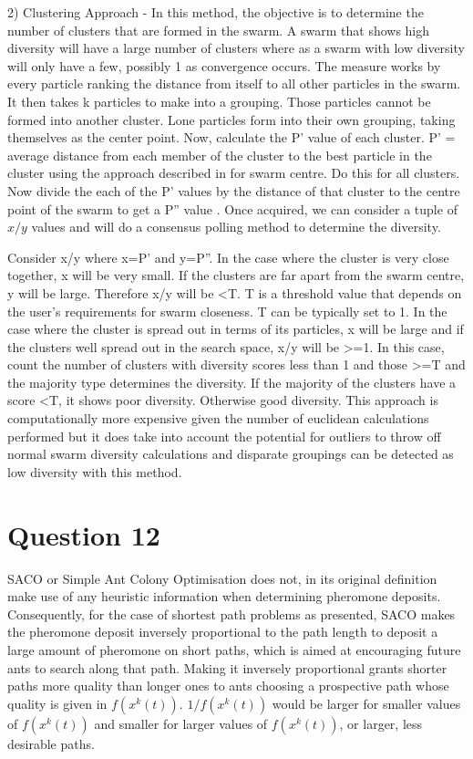 \documentclass[12pt]{article}
\begin{document}
	2) Clustering Approach - In this method, the objective is to determine the number of clusters that are formed in the swarm. A swarm that shows high diversity will have a large number of clusters where as a swarm with low diversity will only have a few, possibly 1 as convergence occurs. The measure works by every particle ranking the distance from itself to all other particles in the swarm. It then takes k particles to make into a grouping. Those particles cannot be formed into another cluster. Lone particles form into their own grouping, taking themselves as the center point.
	Now, calculate the P' value of each cluster. P' = average distance from each member of the cluster to the best particle in the cluster using the approach described in \cite{4630938} for swarm centre. Do this for all clusters. Now divide the each of the P' values by the distance of that cluster to the centre point of the swarm to get a P'' value \cite{4630938}. Once acquired, we can consider a tuple of $x/y$ values and will do a consensus polling method to determine the diversity.

	Consider x/y where x=P' and y=P''. In the case where the cluster is very close together, x will be very small. If the clusters are far apart from the swarm centre, y will be large. Therefore x/y will be <T. T is a threshold value that depends on the user's requirements for swarm closeness. T can be typically set to 1. In the case where the cluster is spread out in terms of its particles, x will be large and if the clusters well spread out in the search space, x/y will be >=1. In this case, count the number of clusters with diversity scores less than 1 and those >=T and the majority type determines the diversity. If the majority of the clusters have a score <T, it shows poor diversity. Otherwise good diversity. This approach is computationally more expensive given the number of euclidean calculations performed but it does take into account the potential for outliers to throw off normal swarm diversity calculations and disparate groupings can be detected as low diversity with this method.
\section{Question 12}
SACO or Simple Ant Colony Optimisation does not, in its original definition make use of any heuristic information when determining pheromone deposits. Consequently, for the case of shortest path problems as presented, SACO makes the pheromone deposit inversely proportional to the path length to deposit a large amount of pheromone on short paths, which is aimed at encouraging future ants to search along that path. Making it inversely proportional grants shorter paths more quality than longer ones to ants choosing a prospective path whose quality is given in $f(x^k(t))$. $1/f(x^k(t))$ would be larger for smaller values of $f(x^k(t))$ and smaller for larger values of $f(x^k(t))$, or larger, less desirable paths.
\end{document}
